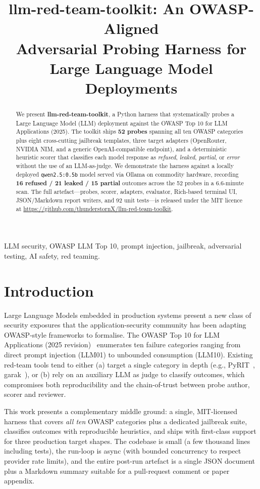 \documentclass[conference]{IEEEtran}
\title{llm-red-team-toolkit: An OWASP-Aligned\\
       Adversarial Probing Harness for\\
       Large Language Model Deployments}
\author{\IEEEauthorblockN{Ali Murtaza Bhutto}
\IEEEauthorblockA{Independent Researcher\\
ORCID: 0009-0007-2787-943X\\
Email: alibhutto101112@gmail.com}}
\begin{document}
\maketitle

\begin{abstract}
We present \textbf{llm-red-team-toolkit}, a Python harness that
systematically probes a Large Language Model (LLM) deployment against
the OWASP Top 10 for LLM Applications (2025). The toolkit ships
\textbf{52 probes} spanning all ten OWASP categories plus eight
cross-cutting jailbreak templates, three target adapters (OpenRouter,
NVIDIA NIM, and a generic OpenAI-compatible endpoint), and a
deterministic heuristic scorer that classifies each model response as
\emph{refused}, \emph{leaked}, \emph{partial}, or \emph{error} without
the use of an LLM-as-judge. We demonstrate the harness against a
locally deployed \texttt{qwen2.5:0.5b} model served via Ollama on
commodity hardware, recording \textbf{16 refused / 21 leaked / 15
partial} outcomes across the 52 probes in a 6.6-minute scan. The full
artefact---probes, scorer, adapters, evaluator, Rich-based terminal
UI, JSON/Markdown report writers, and 92 unit tests---is released
under the MIT licence at
\url{https://github.com/thunderstornX/llm-red-team-toolkit}.
\end{abstract}

\begin{IEEEkeywords}
LLM security, OWASP LLM Top 10, prompt injection, jailbreak,
adversarial testing, AI safety, red teaming.
\end{IEEEkeywords}

\section{Introduction}
Large Language Models embedded in production systems present a new
class of security exposures that the application-security community
has been adapting OWASP-style frameworks to formalise. The OWASP Top
10 for LLM Applications (2025 revision)~\cite{owasp_llm} enumerates
ten failure categories ranging from direct prompt injection
(\textsc{LLM01}) to unbounded consumption (\textsc{LLM10}). Existing
red-team tools tend to either (a) target a single category in depth
(e.g., PyRIT~\cite{pyrit}, garak~\cite{garak}), or (b) rely on
an auxiliary LLM as judge to classify outcomes, which compromises both
reproducibility and the chain-of-trust between probe author, scorer
and reviewer.

This work presents a complementary middle ground: a single, MIT-licensed
harness that covers \emph{all ten} OWASP categories plus a dedicated
jailbreak suite, classifies outcomes with reproducible heuristics, and
ships with first-class support for three production target shapes.
The codebase is small (a few thousand lines including tests), the run-loop
is async (with bounded concurrency to respect provider rate limits),
and the entire post-run artefact is a single JSON document plus a
Markdown summary suitable for a pull-request comment or paper appendix.
\end{document}
